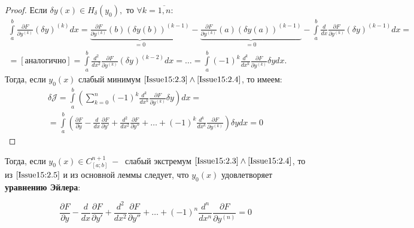 \begin{proof}
	Если $\delta y(x)\in H_\delta(y_0),$ то $\forall k=\overline{1,n}:$
	\begin{multline*}
		\int\limits_a^b\frac{\partial F}{\partial y^{(k)}}(\delta y)^{(k)}dx = \underbrace{\frac{\partial F}{\partial y^{(k)}}(b)(\delta y(b))^{(k-1)}}_{=0}-\underbrace{\frac{\partial F}{\partial y^{(k)}}(a)(\delta y(a))^{(k-1)}}_{=0}-\int\limits_a^b\frac{d}{dx}\frac{\partial F}{\partial y^{(k)}}(\delta y)^{(k-1)}dx= \\ 
		=[\text{аналогично}]=\int\limits_a^b \frac{d^2}{dx^2}\frac{\partial F}{\partial y^{(k)}}(\delta y)^{(k-2)}dx=\dots=\int\limits^b_a\left(-1\right)^k\frac{d^k}{dx^k}\frac{\partial F}{\partial y^{(k)}}\delta y dx.
	\end{multline*}
	Тогда, если $y_0(x)$ слабый минимум $\eqref{Issue15:2.3}\wedge\eqref{Issue15:2.4}$, то имеем: 
	\begin{multline}
		\label{Issue15:2.5}
		\delta\mathcal{J} = \int\limits_a^b\left(\sum_{k=0}^n(-1)^k\frac{d^k}{dx^k}\frac{\partial F}{\partial y^{(k)}}\delta y\right) dx = \\
		= \int\limits_a^b\left(\frac{\partial F}{\partial y}-\frac{d}{dx}\frac{\partial F}{\partial y'}+\frac{d^2}{dx^2}\frac{\partial F}{\partial y''}+\dots+ (-1)^k\frac{d^k}{dx^k}\frac{\partial F}{\partial y^{(k)}}\right)\delta y dx=0
	\end{multline}
\end{proof}

Тогда, если $y_0(x)\in C^{n+1}_{[a;b]}~-~$ слабый экстремум $\eqref{Issue15:2.3}\wedge\eqref{Issue15:2.4}$, то из $\eqref{Issue15:2.5}$ и из основной леммы следует, что $y_0(x)$ удовлетворяет \textbf{уравнению Эйлера}:

\begin{equation}
	\label{Issue15:2.6}
	\frac{\partial F}{\partial y} - \frac{d}{dx}\frac{\partial F}{\partial y'}+\frac{d^2}{dx^2}\frac{\partial F}{\partial y''}+\dots+(-1)^n\frac{d^n}{dx^n}\frac{\partial F}{\partial y^{(n)}}=0
\end{equation}

